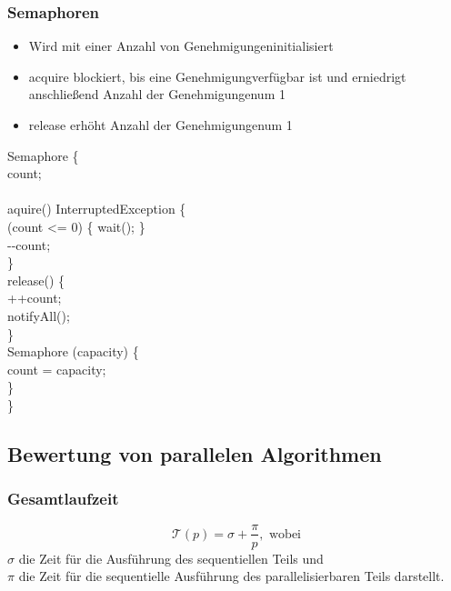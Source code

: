 \newpage

\subsubsection{Semaphoren}
\begin{itemize}
    \item Wird mit einer Anzahl von \glqq Genehmigungen\grqq initialisiert
    \item acquire blockiert, bis eine \glqq Genehmigung\grqq verfügbar ist und erniedrigt anschließend Anzahl der \glqq Genehmigungen\grqq um 1
    \item release erhöht Anzahl der \glqq Genehmigungen\grqq um 1
\end{itemize}
\null
\begin{code}
    \javaPublic \javaClass Semaphore \{\\
        \null\quad\javaPrivate \javaInt count;\\\null\\
        \null\quad    \javaPublic {} \javaVoid aquire()  \javaThrows InterruptedException \{\\
        \null\quad\quad        \javaWhile (count <= 0) \{ wait(); \}\\
        \null\quad\quad\quad            -\null-count;\\
        \null\quad    \}\\
        \null\quad\javaPublic {} \javaVoid release() \{\\
        \null\quad\quad            ++count;\\
        \null\quad\quad            notifyAll();\\
        \null\quad        \}\\
        \null\quad        \javaPublic Semaphore (\javaInt capacity) \{\\
        \null\quad\quad            count = capacity;\\
        \null\quad        \}\\
    \}
\end{code}

\subsection{Bewertung von parallelen Algorithmen}
\subsubsection{Gesamtlaufzeit}
\[
    \mathcal{T}(p) = \sigma + \frac{\pi}{p}, \text{ wobei}
\]
 $\sigma$ die Zeit für die Ausführung des sequentiellen Teils und\\
 $\pi$ die Zeit für die sequentielle Ausführung des parallelisierbaren Teils darstellt.
 

